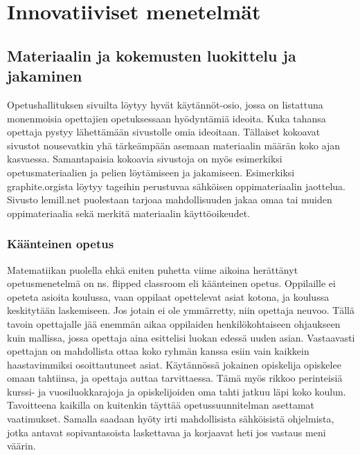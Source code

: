 \documentclass[utf8,bachelor]{gradu3}
\begin{document}
\chapter{Innovatiiviset menetelmät}

\section{Materiaalin ja kokemusten luokittelu ja jakaminen}
Opetushallituksen sivuilta löytyy hyvät käytännöt-osio, jossa on listattuna monenmoisia opettajien opetuksessaan hyödyntämiä ideoita. \parencite[][]{hyvatkaytannot} Kuka tahansa opettaja pystyy lähettämään sivustolle omia ideoitaan. Tällaiset kokoavat sivustot nousevatkin yhä tärkeämpään asemaan materiaalin määrän koko ajan kasvaessa. Samantapaisia kokoavia sivustoja on myös esimerkiksi opetusmateriaalien ja pelien löytämiseen ja jakamiseen. Esimerkiksi graphite.orgista löytyy tageihin perustuvaa sähköisen oppimateriaalin jaottelua. Sivusto lemill.net puolestaan tarjoaa mahdollisuuden jakaa omaa tai muiden oppimateriaalia sekä merkitä materiaalin käyttöoikeudet.

\subsection{Käänteinen opetus}
Matematiikan puolella \parencite[][]{maot} ehkä eniten puhetta viime aikoina herättänyt opetusmenetelmä on ns. flipped classroom eli käänteinen opetus.\parencite[][]{flipped} Oppilaille ei opeteta asioita koulussa, vaan oppilaat opettelevat asiat kotona, ja koulussa keskitytään laskemiseen. Jos jotain ei ole ymmärretty, niin opettaja neuvoo. Tällä tavoin opettajalle jää enemmän aikaa oppilaiden henkilökohtaiseen ohjaukseen kuin mallissa, jossa opettaja aina esittelisi luokan edessä uuden asian. Vastaavasti opettajan on mahdollista ottaa koko ryhmän kanssa esiin vain kaikkein haastavimmiksi osoittautuneet asiat. Käytännössä jokainen opiskelija opiskelee omaan tahtiinsa, ja opettaja auttaa tarvittaessa. Tämä myös rikkoo perinteisiä kurssi- ja vuosiluokkarajoja ja opiskelijoiden oma tahti jatkuu läpi koko koulun. Tavoitteena kaikilla on kuitenkin täyttää opetussuunnitelman asettamat vaatimukset. Samalla saadaan hyöty irti mahdollisista sähköisistä ohjelmista, jotka antavat sopivantasoista laskettavaa ja korjaavat heti jos vastaus meni väärin.
\end{document}
